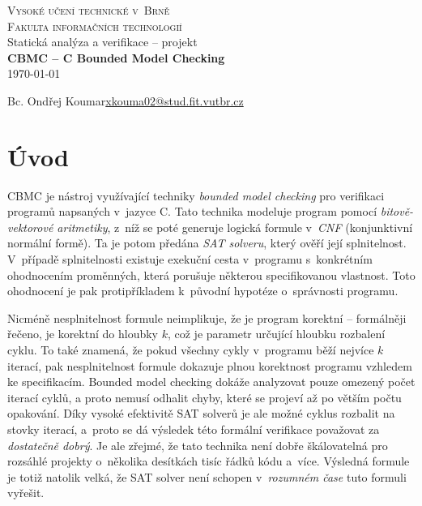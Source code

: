 \documentclass[a4paper, 11pt]{article}
\begin{document}
\begin{titlepage}
    \begin{center}
        {\Huge
            \textsc{Vysoké učení technické v~Brně}\\[0.5em]}
        {\huge
            \textsc{Fakulta informačních technologií}}\\
        {\LARGE
            Statická analýza a verifikace -- projekt\\[0.8em]
            \textbf{CBMC -- C Bounded Model Checking}}\\[2em]
        \Large\today\\
    \end{center}
    {\Large
    Bc. Ondřej Koumar\hfill\href{mailto:xkouma02@stud.fit.vutbr.cz}{xkouma02@stud.fit.vutbr.cz}}
\end{titlepage}

\section{Úvod}

CBMC je nástroj využívající techniky \emph{bounded model checking} pro verifikaci programů napsaných v~jazyce C.
Tato technika modeluje program pomocí \emph{bitově-vek\-to\-ro\-vé aritmetiky}, z~níž se poté generuje logická formule v~\emph{CNF} (konjunktivní normální formě).
Ta je potom předána \emph{SAT solveru}, který ověří její splnitelnost.
V~případě splnitelnosti existuje exekuční cesta v~programu s~konkrétním ohodnocením proměnných, která porušuje některou specifikovanou vlastnost.
Toto ohodnocení je pak protipříkladem k~původní hypotéze o~správnosti programu.

Nicméně nesplnitelnost formule neimplikuje, že je program korektní -- formálněji řečeno, je korektní do hloubky $k$, což je parametr určující hloubku rozbalení cyklu.
To také znamená, že pokud všechny cykly v~programu běží nejvíce $k$ iterací, pak nesplnitelnost formule dokazuje plnou korektnost programu vzhledem ke specifikacím.
Bounded model checking dokáže analyzovat pouze omezený počet iterací cyklů, a proto nemusí odhalit chyby, které se projeví až po větším počtu opakování.
Díky vysoké efektivitě SAT solverů je ale možné cyklus rozbalit na stovky iterací, a~proto se dá výsledek této formální verifikace považovat za \emph{dostatečně dobrý}.
Je ale zřejmé, že tato technika není dobře škálovatelná pro rozsáhlé projekty o~několika desítkách tisíc řádků kódu a~více.
Výsledná formule je totiž natolik velká, že SAT solver není schopen v~\emph{rozumném čase} tuto formuli vyřešit.
\end{document}
